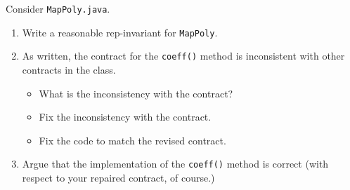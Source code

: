 Consider {\tt MapPoly.java}.

\begin{enumerate}
\item Write a reasonable rep-invariant  for {\tt MapPoly}.
\item As written, the contract for the {\tt coeff()} method
is inconsistent with other contracts in the class.
\begin{itemize}
\item What is the inconsistency with the contract?
\item Fix the inconsistency with the contract.
\item Fix the code to match the revised contract.
\end{itemize}
\item Argue that the implementation of the {\tt coeff()} method is correct
(with respect to your repaired contract, of course.)
\end{enumerate}
